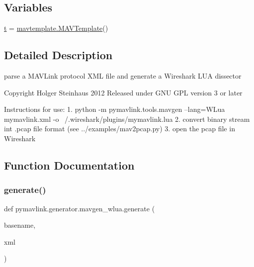 \subsection*{Variables}
\begin{DoxyCompactItemize}
\item 
\mbox{\hyperlink{namespacepymavlink_1_1generator_1_1mavgen__wlua_a8aa3596ee3c13af1cad0b541f7a51808}{t}} = \mbox{\hyperlink{classpymavlink_1_1generator_1_1mavtemplate_1_1MAVTemplate}{mavtemplate.\+M\+A\+V\+Template}}()
\end{DoxyCompactItemize}


\subsection{Detailed Description}
\begin{DoxyVerb}parse a MAVLink protocol XML file and generate a Wireshark LUA dissector

Copyright Holger Steinhaus 2012
Released under GNU GPL version 3 or later

Instructions for use: 
1. python -m pymavlink.tools.mavgen --lang=WLua mymavlink.xml -o ~/.wireshark/plugins/mymavlink.lua
2. convert binary stream int .pcap file format (see ../examples/mav2pcap.py)
3. open the pcap file in Wireshark
\end{DoxyVerb}
 

\subsection{Function Documentation}
\mbox{\label{namespacepymavlink_1_1generator_1_1mavgen__wlua_a3d1e27fd417fd358d786d3383cb3cefd}} 
\subsubsection{\texorpdfstring{generate()}{generate()}}
{\footnotesize\ttfamily def pymavlink.\+generator.\+mavgen\+\_\+wlua.\+generate (\begin{DoxyParamCaption}\item[{}]{basename,  }\item[{}]{xml }\end{DoxyParamCaption})}


